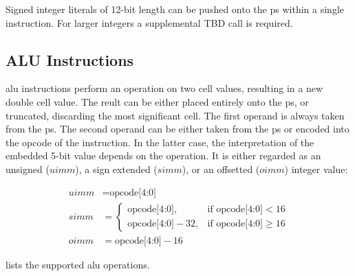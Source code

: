 Signed integer \glspl{literal} of 12-bit length can be pushed onto the \gls{ps} within
a single instruction. For larger integers a supplemental TBD \gls{call} is required.

\subsection{ALU Instructions}
\label{opcodes:alu}
\Gls{alu} instructions perform an operation on two \gls{cell} values, resulting in a new double 
\gls{cell} value. The reult can be either placed entirely onto the \gls{ps}, or truncated, discarding
the most significant \gls{cell}. The first operand is always taken from the \Gls{ps}. The second operand can be
either taken from the \Gls{ps} or encoded into the opcode of the instruction. In the latter case,
the interpretation of the embedded 5-bit value depends on the operation. It is either regarded as an unsigned
($uimm$), a sign extended ($simm$), or an offsetted ($oimm$) integer value:

\begin{align*}
  uimm &= \text{opcode[4:0]}                                     \\
  simm &= \begin{cases}
            \text{opcode[4:0]},      &\text{if opcode[4:0]} < 16 \\
            \text{opcode[4:0]} - 32, &\text{if opcode[4:0]} \ge 16
          \end{cases}                                            \\
  oimm &= \text{opcode[4:0]} - 16
\end{align*}

 lists the supported \gls{alu} operations.

